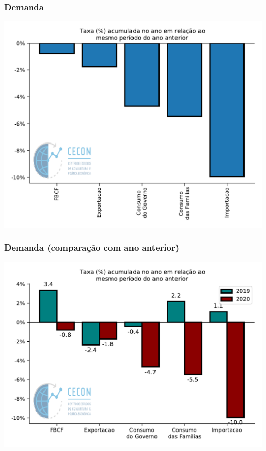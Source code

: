 \documentclass{SelfArx}
\begin{document}
\subsubsection*{Demanda}
\label{sec:orga7cbba2}

\begin{center}
\includegraphics[width=.9\linewidth]{./figs/PIB/Demanda_Acum.pdf}
\end{center}

\subsubsection*{Demanda (comparação com ano anterior)}
\label{sec:org1589aba}

\begin{center}
\includegraphics[width=.9\linewidth]{./figs/PIB/Demanda_Acum_Comparativo.pdf}
\end{center}
\end{document}
